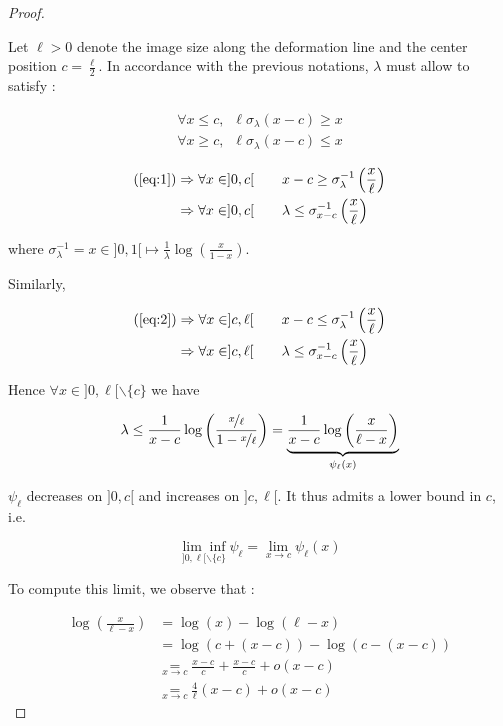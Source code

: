 \documentclass[11pt]{scrartcl}
\begin{document}
\begin{proof}\label{proof}

Let $\ell>0$ denote the image size along the deformation line and the center position $c = \frac{\ell}{2}$. In accordance with the previous notations, $\lambda$ must allow to satisfy :

\begin{align}
\forall x\leq c, \enspace \ell\sigma_\lambda(x - c)\geq x \label{eq:1}\\
\forall x\geq c, \enspace \ell\sigma_\lambda(x - c)\leq x \label{eq:2}
\end{align}


\begin{align}
\text{(\ref{eq:1})} &  \Rightarrow\forall x\in]0, c[\qquad x - c \geq \sigma_\lambda^{-1}\left(\frac{x}{\ell}\right) \\
& \Rightarrow\forall x\in]0, c[ \qquad \lambda \leq \sigma_{x - c}^{-1}\left(\frac{x}{\ell}\right)
\end{align}

where $\sigma_\lambda^{-1} = x\in]0,1[\longmapsto\frac{1}{\lambda}\log\left(\frac{x}{1 - x}\right)$.

Similarly,

\begin{align}
\text{(\ref{eq:2})}&  \Rightarrow\forall x\in]c, \ell[\qquad x - c \leq \sigma_\lambda^{-1}\left(\frac{x}{\ell}\right) \\
& \Rightarrow\forall x\in]c, \ell[ \qquad \lambda \leq \sigma_{x - c}^{-1}\left(\frac{x}{\ell}\right)
\end{align}


Hence $\forall x \in ]0, \ell[\smallsetminus\{c\}$ we have

$$
\lambda \leq \frac{1}{x-c}\log\left(\frac{\nicefrac{x}{\ell}}{1 - \nicefrac{x}{\ell}}\right) = \underbrace{\frac{1}{x - c}\log\left(\frac{x}{\ell - x}\right)}_{\psi_\ell(x)}
$$

$\psi_\ell$ decreases on $]0, c[$ and increases on $]c, \ell[$. It thus admits a lower bound in $c$, i.e.

$$
\underset{]0, \ell[\backslash\{c\}}{\lim\inf}\psi_\ell = \lim_{x\rightarrow c}\psi_\ell(x)
$$

To compute this limit, we observe that :

\begin{align*}
\log\left(\frac{x}{\ell - x}\right) & = \log(x) - \log(\ell - x) \\
& = \log\left(c + \left(x - c\right)\right) - \log\left(c - \left(x - c\right)\right) \\
& \underset{x \rightarrow c}{=}\frac{x - c}{c} + \frac{x - c}{c} + o\left(x - c\right) \\
& \underset{x \rightarrow c}{=} \frac{4}{\ell}\left(x - c\right) + o\left(x - c\right)
\end{align*}


\end{proof}
\end{document}
